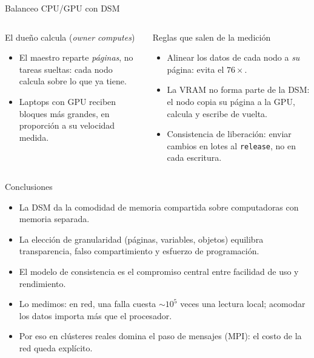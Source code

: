 \documentclass[aspectratio=169,11pt]{beamer}
\begin{document}
\begin{frame}{Balanceo CPU/GPU con DSM}
  \begin{columns}[T]
    \begin{block}{\faBalanceScale\enspace El dueño calcula (\emph{owner computes})}
      \begin{itemize}
        \item El maestro reparte \emph{páginas}, no tareas sueltas: cada nodo calcula sobre lo que ya tiene.
        \item Laptops con GPU reciben bloques más grandes, en proporción a su velocidad medida.
      \end{itemize}
    \end{block}
    \begin{block}{\faClipboardCheck\enspace Reglas que salen de la medición}
      \begin{itemize}
        \item Alinear los datos de cada nodo a \emph{su} página: evita el $76\times$.
        \item La VRAM no forma parte de la DSM: el nodo copia su página a la GPU, calcula y escribe de vuelta.
        \item Consistencia de liberación: enviar cambios en lotes al \texttt{release}, no en cada escritura.
      \end{itemize}
    \end{block}
  \end{columns}
\end{frame}

\begin{frame}{Conclusiones}
  \begin{itemize}\setlength{\itemsep}{.45em}
    \item[\textcolor{menta}{\faCheck}] La DSM da la comodidad de memoria compartida sobre computadoras con memoria separada.
    \item[\textcolor{menta}{\faCheck}] La elección de granularidad (páginas, variables, objetos) equilibra transparencia, falso compartimiento y esfuerzo de programación.
    \item[\textcolor{menta}{\faCheck}] El modelo de consistencia es el compromiso central entre facilidad de uso y rendimiento.
    \item[\textcolor{menta}{\faCheck}] Lo medimos: en red, una falla cuesta $\sim\!10^5$ veces una lectura local; acomodar los datos importa más que el procesador.
    \item[\textcolor{menta}{\faCheck}] Por eso en clústeres reales domina el paso de mensajes (MPI): el costo de la red queda explícito.
  \end{itemize}
\end{frame}
\end{document}
